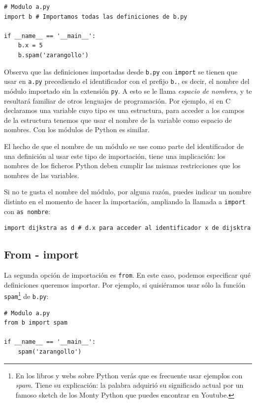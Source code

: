 \begin{lstlisting}
# Modulo a.py
import b # Importamos todas las definiciones de b.py

if __name__ == '__main__':
    b.x = 5
    b.spam('zarangollo')
\end{lstlisting}

Observa que las definiciones importadas desde \texttt{b.py} con \texttt{import} se tienen que usar en \texttt{a.py} precediendo el identificador con el prefijo \texttt{b.}, es decir, el nombre del módulo importado sin la extensión \texttt{py}. A esto se le llama \emph{espacio de nombres}, y te resultará familiar de otros lenguajes de programación. Por ejemplo, si en C declaramos una variable cuyo tipo es una estructura, para acceder a los campos de la estructura tenemos que usar el nombre de la variable como espacio de nombres. Con los módulos de Python es similar.

El hecho de que el nombre de un módulo se use como parte del identificador de una definición al usar este tipo de importación, tiene una implicación: los nombres de los ficheros Python deben cumplir las mismas restricciones que los nombres de las variables. 

Si no te gusta el nombre del módulo, por alguna razón, puedes indicar un nombre distinto en el momento de hacer la importación, ampliando la llamada a \texttt{import} con \texttt{as nombre}: 

\begin{lstlisting}
import dijkstra as d # d.x para acceder al identificador x de dijsktra
\end{lstlisting}

\subsection{From - import}

La segunda opción de importación es \texttt{from}. En este caso, podemos especificar qué definiciones queremos importar. Por ejemplo, si quisiéramos usar sólo la función \texttt{spam}\footnote{En los libros y webs sobre Python verás que es frecuente usar ejemplos con \emph{spam}. Tiene su explicación: la palabra adquirió su significado actual por un famoso sketch de los Monty Python que puedes encontrar en Youtube.} de \texttt{b.py}:

\begin{lstlisting}
# Modulo a.py
from b import spam

if __name__ == '__main__':
    spam('zarangollo')
\end{lstlisting}

